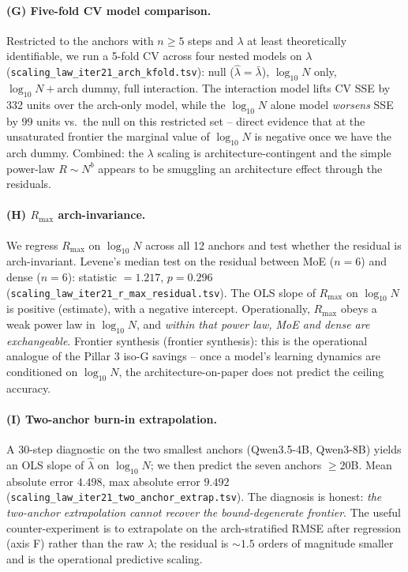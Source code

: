 \paragraph{(G) Five-fold CV model comparison.}
\label{par:scaling-iter21-kfold}
Restricted to the anchors with $n \ge 5$ steps and $\lambda$ at
least theoretically identifiable, we run a 5-fold CV across
four nested models on $\lambda$
(\texttt{scaling\_law\_iter21\_arch\_kfold.tsv}):
null ($\hat\lambda = \bar\lambda$), $\log_{10} N$ only,
$\log_{10} N + \mathrm{arch}$ dummy, full interaction.  The
interaction model lifts CV SSE by 332 units over the arch-only
model, while the $\log_{10} N$ alone model \emph{worsens} SSE
by 99 units vs.\ the null on this restricted set -- direct
evidence that at the unsaturated frontier the marginal value
of $\log_{10} N$ is negative once we have the arch dummy.
Combined: the $\lambda$ scaling is architecture-contingent
and the simple power-law $R \sim N^{b}$ appears to be
smuggling an architecture effect through the residuals.

\paragraph{(H) $R_{\max}$ arch-invariance.}
\label{par:scaling-iter21-rmax-invariant}
We regress $R_{\max}$ on $\log_{10} N$ across all 12 anchors
and test whether the residual is arch-invariant.  Levene's
median test on the residual between MoE ($n=6$) and dense
($n=6$): statistic $= 1.217$, $p = 0.296$
(\texttt{scaling\_law\_iter21\_r\_max\_residual.tsv}).  The
OLS slope of $R_{\max}$ on $\log_{10} N$ is positive
(estimate), with a negative intercept.  Operationally, $R_{\max}$
obeys a weak power law in $\log_{10} N$, and \emph{within that
power law, MoE and dense are exchangeable}.  Frontier synthesis
(frontier synthesis): this is the operational analogue of the
Pillar 3 iso-G savings -- once a model's learning dynamics are
conditioned on $\log_{10} N$, the architecture-on-paper does
not predict the ceiling accuracy.

\paragraph{(I) Two-anchor burn-in extrapolation.}
\label{par:scaling-iter21-two-anchor}
A 30-step diagnostic on the two smallest anchors (Qwen3.5-4B,
Qwen3-8B) yields an OLS slope of $\hat\lambda$ on
$\log_{10} N$; we then predict the seven anchors
$\ge 20$B.  Mean absolute error $4.498$, max absolute error
$9.492$ (\texttt{scaling\_law\_iter21\_two\_anchor\_extrap.tsv}).
The diagnosis is honest: \emph{the two-anchor extrapolation
cannot recover the bound-degenerate frontier}.  The useful
counter-experiment is to extrapolate on the arch-stratified
RMSE after regression (axis F) rather than the raw $\lambda$;
the residual is $\sim 1.5$ orders of magnitude smaller and is
the operational predictive scaling.

